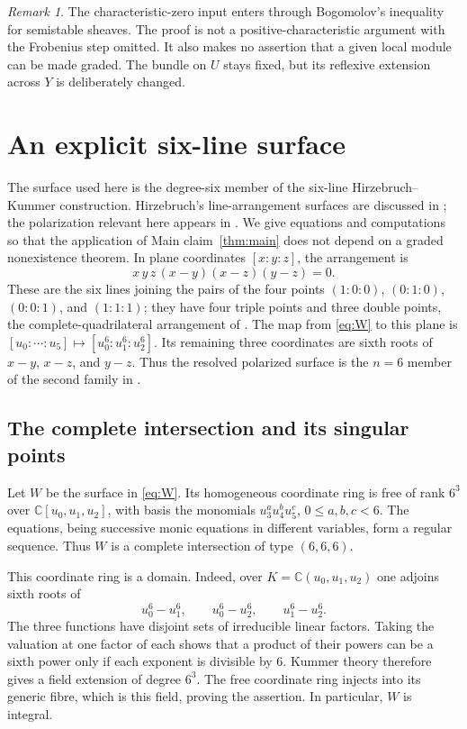\documentclass[11pt,reqno]{amsart}
\numberwithin{equation}{section}
\theoremstyle{definition}
\theoremstyle{remark}
\newtheorem{remark}[theorem]{Remark}
\newcommand{\C}{\mathbb C}
\begin{document}
\begin{remark}\label{rem:scope}
The characteristic-zero input enters through Bogomolov's inequality
for semistable sheaves. The proof is not a positive-characteristic
argument with the Frobenius step omitted. It also makes no assertion
that a given local module can be made graded. The bundle on $U$ stays
fixed, but its reflexive extension across $Y$ is deliberately changed.
\end{remark}

\section{An explicit six-line surface}\label{sec:example}

The surface used here is the degree-six member of the six-line
Hirzebruch--Kummer construction. Hirzebruch's line-arrangement surfaces
are discussed in \cite[Section 2]{Hirzebruch1983}; the polarization relevant here
appears in \cite[Remark 4.2 and Corollary 4.3]{Anghel2026}.
We give equations and computations so that the application of
Main claim~\ref{thm:main} does not depend on a graded nonexistence
theorem. In plane coordinates $[x:y:z]$, the arrangement is
\[
 x\,y\,z\,(x-y)(x-z)(y-z)=0.
\]
These are the six lines joining the pairs of the four points
$(1:0:0)$, $(0:1:0)$, $(0:0:1)$, and $(1:1:1)$; they have four triple
points and three double points, the complete-quadrilateral arrangement
of \cite[Section 1.1]{Hirzebruch1983}.
The map from \eqref{eq:W} to this plane is
$[u_0:\cdots:u_5]\mapsto[u_0^6:u_1^6:u_2^6]$.
Its remaining three coordinates are sixth roots of $x-y$, $x-z$, and
$y-z$. Thus the resolved polarized surface is the $n=6$ member of the
second family in \cite[Remark 4.2]{Anghel2026}.

\subsection{The complete intersection and its singular points}
Let $W$ be the surface in \eqref{eq:W}. Its homogeneous coordinate
ring is free of rank $6^3$ over $\C[u_0,u_1,u_2]$, with basis the
monomials $u_3^a u_4^b u_5^c$, $0\leq a,b,c<6$. The equations,
being successive monic equations in different variables, form a
regular sequence. Thus $W$ is a complete intersection of type
$(6,6,6)$.

This coordinate ring is a domain. Indeed, over
$K=\C(u_0,u_1,u_2)$ one adjoins sixth roots of
\[
 u_0^6-u_1^6,\qquad u_0^6-u_2^6,\qquad u_1^6-u_2^6.
\]
The three functions have disjoint sets of irreducible linear factors.
Taking the valuation at one factor of each shows that a product of
their powers can be a sixth power only if each exponent is divisible
by $6$. Kummer theory therefore gives a field extension of degree
$6^3$. The free coordinate ring injects into its generic fibre, which
is this field, proving the assertion. In particular, $W$ is integral.
\end{document}
